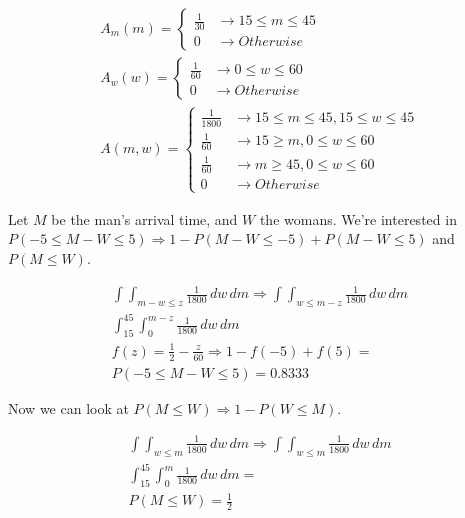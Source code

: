 \documentclass[11pt]{article}\usepackage[]{graphicx}\usepackage[]{xcolor}
\begin{document}
\begin{easylist}[enumerate]
    \[
        \begin{aligned}
            A_m(m) =
            \begin{cases}
                \frac{1}{30} &\to 15 \le m \le 45\\
                0 &\to Otherwise
            \end{cases}\\
            A_w(w) =
            \begin{cases}
                \frac{1}{60} &\to 0 \le w \le 60\\
                0 &\to Otherwise
            \end{cases}\\
            A(m, w) =
            \begin{cases}
                \frac{1}{1800} &\to 15 \le m \le 45, 15 \le w \le 45\\
                \frac{1}{60} &\to 15 \ge m, 0 \le w \le 60\\
                \frac{1}{60} &\to m \ge 45, 0 \le w \le 60\\
                0 &\to Otherwise
            \end{cases}
        \end{aligned}
    \]

    Let $M$ be the man's arrival time, and $W$ the womans. We're interested in $P(-5 \le M - W \le 5) \Rightarrow 1 -
    P(M - W \le -5) + P(M - W \le 5)$ and $P(M \le W)$.




    \[
        \begin{aligned}
            \int\int_{m - w \le z} \frac{1}{1800} \, dw \, dm \Rightarrow
                \int\int_{w \le m - z} \frac{1}{1800} \, dw \, dm\\
            \int^{45}_{15} \int_{0}^{m - z} \frac{1}{1800} \, dw \, dm\\
            f(z) = \frac{1}{2} - \frac{z}{60} \Rightarrow 1 - f(-5) + f(5) =\\
                \boxed{P(-5 \le M - W \le 5) = 0.8333}
        \end{aligned}
    \]

    Now we can look at $P(M \le W) \Rightarrow 1 - P(W \le M)$.

    \[
        \begin{aligned}
            \int \int_{w \le m} \frac{1}{1800} \, dw \, dm \Rightarrow \int \int_{w \le m} \frac{1}{1800} \, dw \, dm\\
            \int_{15}^{45} \int_0^m \frac{1}{1800} \, dw \, dm =\\
            \boxed{P(M \le W) = \frac{1}{2}}
        \end{aligned}
    \]


\end{easylist}
\end{document}
